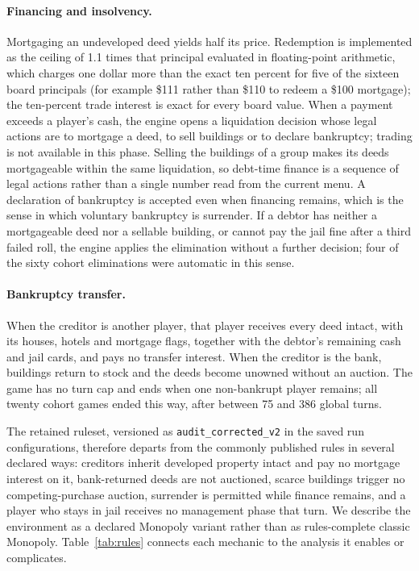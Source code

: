 \paragraph{Financing and insolvency.} Mortgaging an undeveloped deed yields half its price. Redemption is implemented as the ceiling of 1.1 times that principal evaluated in floating-point arithmetic, which charges one dollar more than the exact ten percent for five of the sixteen board principals (for example \$111 rather than \$110 to redeem a \$100 mortgage); the ten-percent trade interest is exact for every board value. When a payment exceeds a player's cash, the engine opens a liquidation decision whose legal actions are to mortgage a deed, to sell buildings or to declare bankruptcy; trading is not available in this phase. Selling the buildings of a group makes its deeds mortgageable within the same liquidation, so debt-time finance is a sequence of legal actions rather than a single number read from the current menu. A declaration of bankruptcy is accepted even when financing remains, which is the sense in which voluntary bankruptcy is surrender. If a debtor has neither a mortgageable deed nor a sellable building, or cannot pay the jail fine after a third failed roll, the engine applies the elimination without a further decision; four of the sixty cohort eliminations were automatic in this sense.

\paragraph{Bankruptcy transfer.} When the creditor is another player, that player receives every deed intact, with its houses, hotels and mortgage flags, together with the debtor's remaining cash and jail cards, and pays no transfer interest. When the creditor is the bank, buildings return to stock and the deeds become unowned without an auction. The game has no turn cap and ends when one non-bankrupt player remains; all twenty cohort games ended this way, after between 75 and 386 global turns.

The retained ruleset, versioned as \texttt{audit\_corrected\_v2} in the saved run configurations, therefore departs from the commonly published rules in several declared ways: creditors inherit developed property intact and pay no mortgage interest on it, bank-returned deeds are not auctioned, scarce buildings trigger no competing-purchase auction, surrender is permitted while finance remains, and a player who stays in jail receives no management phase that turn. We describe the environment as a declared Monopoly variant rather than as rules-complete classic Monopoly. Table~\ref{tab:rules} connects each mechanic to the analysis it enables or complicates.

